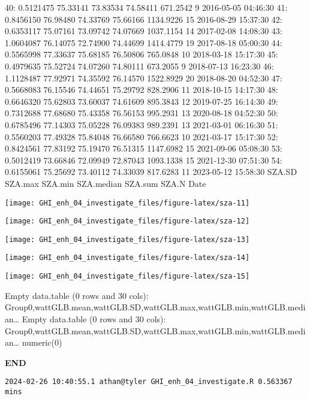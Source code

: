 \documentclass[
  10pt,
  a4paper,oneside]{article}
\begin{document}
40: 0.5121475 75.33141 73.83534 74.58411 671.2542 9 2016-05-05 04:46:30
41: 0.8456150 76.98480 74.33769 75.66166 1134.9226 15 2016-08-29 15:37:30
42: 0.6353117 75.07161 73.09742 74.07669 1037.1154 14 2017-02-08 14:08:30
43: 1.0604087 76.14075 72.74900 74.44699 1414.4779 19 2017-08-18 05:00:30
44: 0.5565998 77.33637 75.68185 76.50806 765.0848 10 2018-03-18 15:17:30
45: 0.4979635 75.52724 74.07260 74.80111 673.2055 9 2018-07-13 16:23:30
46: 1.1128487 77.92971 74.35592 76.14570 1522.8929 20 2018-08-20 04:52:30
47: 0.5668083 76.15546 74.44651 75.29792 828.2906 11 2018-10-15 14:17:30
48: 0.6646320 75.62803 73.60037 74.61609 895.3843 12 2019-07-25 16:14:30
49: 0.7312688 77.68680 75.43358 76.56153 995.2931 13 2020-08-18 04:52:30
50: 0.6785496 77.14303 75.05228 76.09383 989.2391 13 2021-03-01 06:16:30
51: 0.5560203 77.49328 75.84048 76.66580 766.6623 10 2021-03-17 15:17:30
52: 0.8424561 77.83192 75.19470 76.51315 1147.6982 15 2021-09-06 05:08:30
53: 0.5012419 73.66846 72.09949 72.87043 1093.1338 15 2021-12-30 07:51:30
54: 0.6155061 75.25692 73.40112 74.33039 817.6283 11 2023-05-12 15:58:30
SZA.SD SZA.max SZA.min SZA.median SZA.sum SZA.N Date

\begin{center}\texttt{[image: GHI\_enh\_04\_investigate\_files/figure-latex/sza-11]} \end{center}

\begin{center}\texttt{[image: GHI\_enh\_04\_investigate\_files/figure-latex/sza-12]} \end{center}

\begin{center}\texttt{[image: GHI\_enh\_04\_investigate\_files/figure-latex/sza-13]} \end{center}

\begin{center}\texttt{[image: GHI\_enh\_04\_investigate\_files/figure-latex/sza-14]} \end{center}

\begin{center}\texttt{[image: GHI\_enh\_04\_investigate\_files/figure-latex/sza-15]} \end{center}

Empty data.table (0 rows and 30 cols): Group0,wattGLB.mean,wattGLB.SD,wattGLB.max,wattGLB.min,wattGLB.median\ldots{}
Empty data.table (0 rows and 30 cols): Group0,wattGLB.mean,wattGLB.SD,wattGLB.max,wattGLB.min,wattGLB.median\ldots{}
numeric(0)

\textbf{END}

\begin{verbatim}
2024-02-26 10:40:55.1 athan@tyler GHI_enh_04_investigate.R 0.563367 mins
\end{verbatim}
\end{document}
